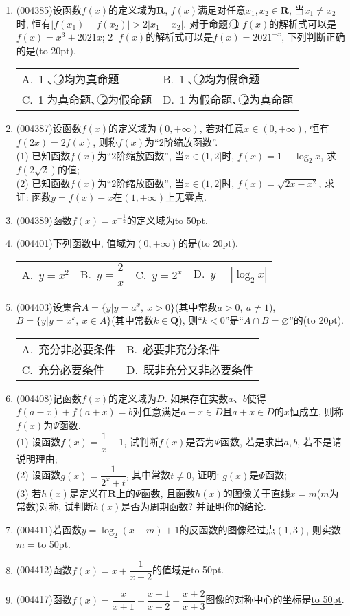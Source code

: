 \documentclass[10pt,a4paper]{article}
\newcommand{\blank}[1]{\underline{\hbox to #1pt{}}}
\newcommand{\bracket}[1]{(\hbox to #1pt{})}
\newcommand{\twoch}[4]{\par\begin{tabular}{p{.46\textwidth}p{.46\textwidth}}
A.~#1& B.~#2\\
C.~#3& D.~#4
\end{tabular}}
\newcommand{\fourch}[4]{\par\begin{tabular}{p{.23\textwidth}p{.23\textwidth}p{.23\textwidth}p{.23\textwidth}}
A.~#1 &B.~#2& C.~#3& D.~#4
\end{tabular}}
\begin{document}
\begin{enumerate}[1.]
\item {\tiny (004385)}设函数$f(x)$的定义域为$\mathbf{R}$, $f(x)$满足对任意$x_1,x_2\in \mathbf{R}$, 当$x_1\ne x_2$时, 恒有$|f(x_1)-f(x_2)|>2|x_1-x_2|$. 对于命题: \textcircled{1} $f(x)$的解析式可以是$f(x)=x^3+2021x$; \textcircled{2} $f(x)$的解析式可以是$f(x)=2021^{-x}$, 下列判断正确的是\bracket{20}.
\twoch{\textcircled{1}、\textcircled{2}均为真命题}{\textcircled{1}、\textcircled{2}均为假命题}{\textcircled{1}为真命题、\textcircled{2}为假命题}{\textcircled{1}为假命题、\textcircled{2}为真命题}
\item {\tiny (004387)}设函数$f(x)$的定义域为$(0,+\infty)$, 若对任意$x\in (0,+\infty)$, 恒有$f(2x)=2f(x)$, 则称$f(x)$为``$2$阶缩放函数''.\\
(1) 已知函数$f(x)$为``$2$阶缩放函数'', 当$x\in (1,2]$时, $f(x)=1-\log_2 x$, 求$f(2\sqrt{2})$的值;\\
(2) 已知函数$f(x)$为``$2$阶缩放函数'', 当$x\in (1,2]$时, $f(x)=\sqrt{2x-x^2}$, 求证: 函数$y=f(x)-x$在$(1,+\infty)$上无零点.
\item {\tiny (004389)}函数$f(x)=x^{- \frac 12}$的定义域为\blank{50}.
\item {\tiny (004401)}下列函数中, 值域为$(0,+\infty)$的是\bracket{20}.
\fourch{$y=x^2$}{$y=\dfrac 2x$}{$y=2^x$}{$y=|\log_2x|$}
\item {\tiny (004403)}设集合$A=\{y|y=a^x,\ x>0\}$(其中常数$a>0,  \ a\ne 1$), $B=\{y|y=x^k,\ x\in A\}$(其中常数$k\in \mathbf{Q}$), 则``$k<0$''是``$A\cap B=\varnothing$''的\bracket{20}.
\twoch{充分非必要条件}{必要非充分条件}{充分必要条件}{既非充分又非必要条件}
\item {\tiny (004408)}记函数$f(x)$的定义域为$D$. 如果存在实数$a$、$b$使得$f(a-x)+f(a+x)=b$对任意满足$a-x\in D$且$a+x\in D$的$x$恒成立, 则称$f(x)$为$\Psi$函数.\\
(1) 设函数$f(x)=\dfrac 1x-1$, 试判断$f(x)$是否为$\Psi$函数, 若是求出$a,b$, 若不是请说明理由;\\
(2) 设函数$g(x)=\dfrac 1{2^x+t}$, 其中常数$t\ne 0$, 证明: $g(x)$是$\Psi$函数;\\
(3) 若$h(x)$是定义在$\mathbf{R}$上的$\Psi$函数, 且函数$h(x)$的图像关于直线$x=m$($m$为常数)对称, 试判断$h(x)$是否为周期函数? 并证明你的结论.
\item {\tiny (004411)}若函数$y=\log_2(x-m)+1$的反函数的图像经过点$(1,3)$, 则实数$m=$\blank{50}.
\item {\tiny (004412)}函数$f(x)=x+\dfrac 1{x-2}$的值域是\blank{50}.
\item {\tiny (004417)}函数$f(x)=\dfrac x{x+1}+\dfrac{x+1}{x+2}+\dfrac{x+2}{x+3}$图像的对称中心的坐标是\blank{50}.

\end{enumerate}
\end{document}
